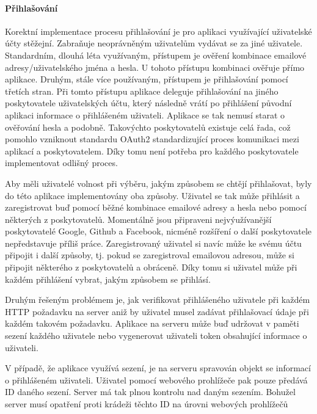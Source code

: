 			\paragraph{Přihlašování}

			Korektní implementace procesu přihlašování je pro aplikaci využívající uživatelské účty stěžejní.
			Zabraňuje neoprávněným uživatelům vydávat se za jiné uživatele.
			Standardním, dlouhá léta využívaným, přístupem je ověření kombinace emailové adresy/uživatelského jména
			a hesla.
			U tohoto přístupu kombinaci ověřuje přímo aplikace.
			Druhým, stále více používaným, přístupem je přihlašování pomocí třetích stran.
			Při tomto přístupu aplikace deleguje přihlašování na jiného poskytovatele uživatelských účtu, který následně
			vrátí po přihlášení původní aplikaci informace o přihlášeném uživateli.
			Aplikace se tak nemusí starat o ověřování hesla a podobně.
			Takovýchto poskytovatelů existuje celá řada, což pomohlo vzniknout standardu OAuth2 standardizující proces
			komunikaci mezi aplikací a poskytovatelem.
			Díky tomu není potřeba pro každého poskytovatele implementovat odlišný proces.

			Aby měli uživatelé volnost při výběru, jakým způsobem se chtějí přihlašovat, byly do této aplikace implementovány
			oba způsoby.
			Uživatel se tak může přihlásit a zaregistrovat buď pomocí běžné kombinace emailové adresy a hesla nebo pomocí
			některých z poskytovatelů.
			Momentálně jsou připraveni nejvýužívanější poskytovatelé Google, Github a Facebook, nicméně rozšíření o
			další poskytovatele nepředstavuje příliš práce.
			Zaregistrovaný uživatel si navíc může ke svému účtu připojit i další způsoby, tj. pokud se zaregistroval emailovou
			adresou, může si připojit některého z poskytovatelů a obráceně.
			Díky tomu si uživatel může při každém přihlášení vybrat, jakým způsobem se přihlásí.

			Druhým řešeným problémem je, jak verifikovat přihlášeného uživatele při každém \ac{HTTP} požadavku na server
			aniž by uživatel musel zadávat přihlašovací údaje při každém takovém požadavku.
			Aplikace na serveru může buď udržovat v paměti sezení každého uživatele nebo vygenerovat uživateli token
			obsahující informace o uživateli.

			V případě, že aplikace využívá sezení, je na serveru spravován objekt se informací o přihlášeném uživateli.
			Uživatel pomocí webového prohlížeče pak pouze předává ID daného sezení.
			Server má tak plnou kontrolu nad daným sezením.
			Bohužel server musí opatření proti krádeži těchto ID na úrovni webových prohlížečů

